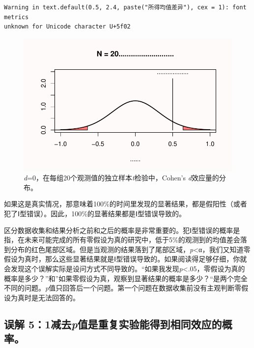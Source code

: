 \documentclass[
  letterpaper,
  DIV=11,
  numbers=noendperiod]{scrreprt}
\begin{document}
\begin{verbatim}
Warning in text.default(0.5, 2.4, paste("所得均值差异"), cex = 1): font metrics
unknown for Unicode character U+5f02
\end{verbatim}

\begin{figure}

{\centering \includegraphics[width=1\textwidth,height=\textheight]{01-pvalue_files/figure-pdf/fig-fig138-1.pdf}

}

\caption{\label{fig-fig138}\emph{d}=0，在每组20个观测值的独立样本\emph{t}检验中，Cohen's
\emph{d}效应量的分布。}

\end{figure}

如果这是真实情况，那意味着100\%的时间里发现的显著结果，都是假阳性（或者犯了Ⅰ型错误）。因此，100\%的显著结果都是Ⅰ型错误导致的。

区分数据收集和结果分析之前和之后的概率是非常重要的。犯Ⅰ型错误的概率是指，在未来可能完成的所有零假设为真的研究中，低于5\%的观测到的均值差会落到分布的红色尾部区域。但是当观测的结果落到了尾部区域，\emph{p}\textless α，我们又知道零假设为真时，那么这些显著结果就是Ⅰ型错误导致的。如果阅读得足够仔细，你就会发现这个误解实际是设问方式不同导致的。``如果我发现\emph{p}\textless.05，零假设为真的概率是多少？''和''如果零假设为真，观察到显著结果的概率是多少？``是两个完全不同的问题。\emph{p}值只回答后一个问题。第一个问题在数据收集前没有主观判断零假设为真时是无法回答的。

\hypertarget{ux8befux89e3-51ux51cfux53bbpux503cux662fux91cdux590dux5b9eux9a8cux80fdux5f97ux5230ux76f8ux540cux6548ux5e94ux7684ux6982ux7387}{%
\subsection{\texorpdfstring{误解
5：1减去\emph{p}值是重复实验能得到相同效应的概率。}{误解 5：1减去p值是重复实验能得到相同效应的概率。}}\label{ux8befux89e3-51ux51cfux53bbpux503cux662fux91cdux590dux5b9eux9a8cux80fdux5f97ux5230ux76f8ux540cux6548ux5e94ux7684ux6982ux7387}}
\end{document}
